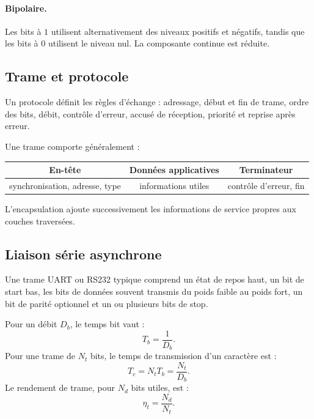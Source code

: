 \paragraph{Bipolaire.}
Les bits à $1$ utilisent alternativement des niveaux positifs et négatifs, tandis que les bits à $0$ utilisent le niveau nul. La composante continue est réduite.


\subsection{Trame et protocole}

Un protocole définit les règles d'échange : adressage, début et fin de trame, ordre des bits, débit, contrôle d'erreur, accusé de réception, priorité et reprise après erreur.

Une trame comporte généralement :
\begin{center}
\begin{tabular}{|c|c|c|}
\hline
\textbf{En-tête} & \textbf{Données applicatives} & \textbf{Terminateur}\\\hline
synchronisation, adresse, type & informations utiles & contrôle d'erreur, fin\\\hline
\end{tabular}
\end{center}

L'encapsulation ajoute successivement les informations de service propres aux couches traversées.


\subsection{Liaison série asynchrone}

Une trame UART ou RS232 typique comprend un état de repos haut, un bit de start bas, les bits de données souvent transmis du poids faible au poids fort, un bit de parité optionnel et un ou plusieurs bits de stop.

\begin{center}\TLTrameSerie\end{center}

Pour un débit $D_b$, le temps bit vaut :
\[
\boxed{T_b=\frac{1}{D_b}.}
\]
Pour une trame de $N_t$ bits, le temps de transmission d'un caractère est :
\[
\boxed{T_c=N_tT_b=\frac{N_t}{D_b}.}
\]
Le rendement de trame, pour $N_d$ bits utiles, est :
\[
\boxed{\eta_t=\frac{N_d}{N_t}.}
\]

